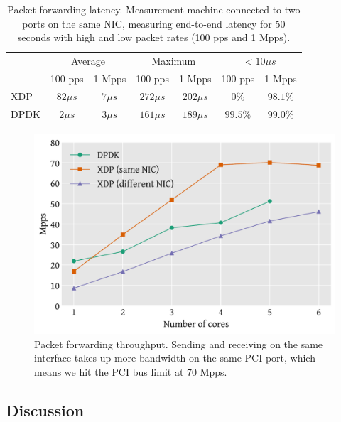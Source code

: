 \documentclass[sigconf]{acmart}
\begin{document}
\begin{table}[tbp]
  \caption{\label{tbl:fwd-latency}Packet forwarding latency. Measurement machine
    connected to two ports on the same NIC, measuring end-to-end latency for 50
    seconds with high and low packet rates (100 pps and 1 Mpps).}
\centering
\begin{tabular}{lcccccc}
  \toprule
   & \multicolumn{2}{c}{Average}  &  \multicolumn{2}{c}{Maximum} &  \multicolumn{2}{c}{$< 10 \mu s$}  \\
   & \small 100 pps & \small 1 Mpps  &  \small 100 pps & \small 1 Mpps & \small 100 pps & \small 1 Mpps \\
  \midrule
  XDP & $82 \mu s$ & $7 \mu s$ & $272 \mu s$ & $202 \mu s$ & $0 \%$ & $98.1 \%$  \\
  DPDK & $2 \mu s$ &  $3 \mu s$ & $161 \mu s$ & $189 \mu s$ & $99.5 \%$ & $99.0 \%$  \\
\bottomrule
\end{tabular}
\end{table}

\begin{figure}[t]
\centering
\includegraphics[width=\linewidth]{figures/redirect-test.pdf}
\caption{\label{fig:redirect-test} Packet forwarding throughput. Sending and
  receiving on the same interface takes up more bandwidth on the same PCI port,
  which means we hit the PCI bus limit at 70 Mpps.}
\end{figure}

\subsection{Discussion}
\label{sec:perf-discussion}
\end{document}
